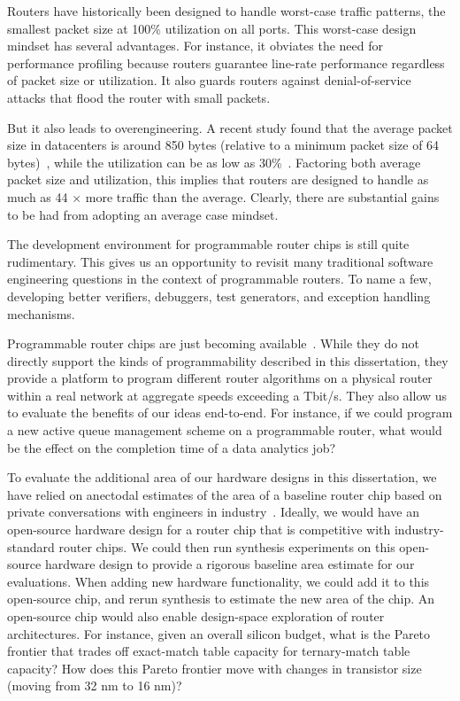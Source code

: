  Routers have historically been
designed to handle worst-case traffic patterns, \ie the smallest packet size at
100\% utilization on all ports. This worst-case design mindset has several
advantages. For instance, it obviates the need for performance profiling
because routers guarantee line-rate performance regardless of packet size or
utilization. It also guards routers against denial-of-service attacks that
flood the router with small packets.

But it also leads to overengineering. A recent study found that the average
packet size in datacenters is around 850 bytes (relative to a minimum packet
size of 64 bytes)~\cite{theo_dc}, while the utilization can be as low as
30\%~\cite{theo_dc}. Factoring both average packet size and utilization, this
implies that routers are designed to handle as much as 44 $\times$ more traffic
than the average. Clearly, there are substantial gains to be had from adopting
an average case mindset.

 The development
environment for programmable router chips is still quite rudimentary. This
gives us an opportunity to revisit many traditional software engineering
questions in the context of programmable routers. To name a few, developing
better verifiers, debuggers, test generators, and exception handling
mechanisms.

 Programmable
router chips are just becoming available~\cite{tofino}. While they do not
directly support the kinds of programmability described in this dissertation,
they provide a platform to program different router algorithms on a physical
router within a real network at aggregate speeds exceeding a Tbit/s.  They also
allow us to evaluate the benefits of our ideas end-to-end. For instance, if we
could program a new active queue management scheme on a programmable router,
what would be the effect on the completion time of a data analytics job?

 To evaluate the
additional area of our hardware designs in this dissertation, we have relied on
anectodal estimates of the area of a baseline router chip based on private
conversations with engineers in industry~\cite{gibb_parsing}. Ideally, we would
have an open-source hardware design for a router chip that is competitive with
industry-standard router chips. We could then run synthesis experiments on this
open-source hardware design to provide a rigorous baseline area estimate for
our evaluations.  When adding new hardware functionality, we could add it to
this open-source chip, and rerun synthesis to estimate the new area of the
chip. An open-source chip would also enable design-space exploration of router
architectures. For instance, given an overall silicon budget, what is the
Pareto frontier that trades off exact-match table capacity for ternary-match
table capacity? How does this Pareto frontier move with changes in transistor
size (\eg moving from 32 nm to 16 nm)?

